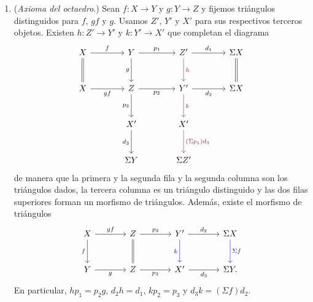 \begin{defi}
\begin{enumerate}[label = \textup{TR\arabic*.},leftmargin=2.5em]
\item (\emph{Axioma del octaedro}.) Sean $f\colon X\to Y$ y $g\colon Y\to Z$ y fijemos triángulos distinguidos para $f$, $gf$ y $g$. Usamos $Z'$, $Y'$ y $X'$ para sus respectivos terceros objetos. Existen $h\colon Z'\to Y'$ y $k\colon Y'\to X'$ que completan el diagrama
\[
\begin{tikzcd}[column sep=large,row sep=large]
X \arrow[r,"f"] \arrow[d,equal] & Y \arrow[r,"p_1"] \arrow[d,"g"'] & Z' \arrow[r,"d_1"] \arrow[d,rojoDiagramaCIMAT,"h"] & \Sigma X \arrow[d,equal]\\
X \arrow[r,"gf"'] & Z \arrow[r,"p_2"'] \arrow[d,"p_3"'] & Y' \arrow[r,"d_2"'] \arrow[d,rojoDiagramaCIMAT,"k"] & \Sigma X\\
& X' \arrow[d,"d_3"'] & X' \arrow[d,rojoDiagramaCIMAT,"{(\Sigma p_1)d_3}"] &\\
& \Sigma Y & \Sigma Z' &
\end{tikzcd}
\]
de manera que la primera y la segunda fila y la segunda columna son los triángulos dados, la tercera columna es un triángulo distinguido y las dos filas superiores forman un morfismo de triángulos. Además, existe el morfismo de triángulos
\[
\begin{tikzcd}[column sep=large,row sep=large]
X \arrow[r,"gf"] \arrow[d,blue,"f"'] & Z \arrow[r,"p_2"] \arrow[d,equal] & Y' \arrow[r,"d_2"] \arrow[d,blue,"k"'] & \Sigma X \arrow[d,blue,"\Sigma f"]\\
Y \arrow[r,"g"'] & Z \arrow[r,"p_3"'] & X' \arrow[r,"d_3"'] & \Sigma Y.
\end{tikzcd}
\]
En particular, $hp_1=p_2g$, $d_2h=d_1$, $kp_2=p_3$ y $d_3k=(\Sigma f)d_2$.
\end{enumerate}
\end{defi}


